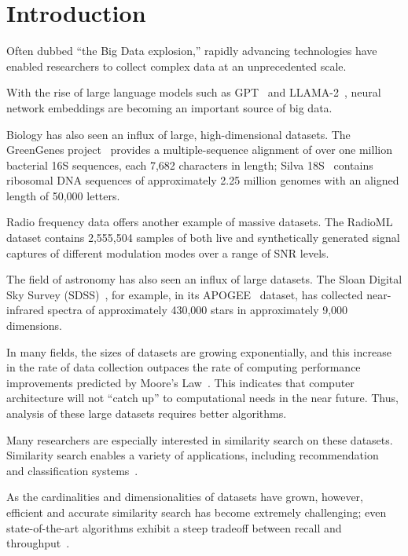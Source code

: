 \section{Introduction}
\label{sec:introduction}

Often dubbed ``the Big Data explosion,'' rapidly advancing technologies have enabled researchers to collect complex data at an unprecedented scale. 

With the rise of large language models such as GPT~\cite{2020arXiv200514165B, OpenAI2023GPT4TR} and LLAMA-2~\cite{Touvron2023Llama2O}, neural network embeddings are becoming an important source of big data.

Biology has also seen an influx of large, high-dimensional datasets.
The GreenGenes project~\cite{desantis2006greengenes} provides a multiple-sequence alignment of over one million bacterial 16S sequences, each 7,682 characters in length;
Silva 18S~\cite{10.1093/nar/gks1219} contains ribosomal DNA sequences of approximately 2.25 million genomes with an aligned length of 50,000 letters.

Radio frequency data offers another example of massive datasets. 
The RadioML~\cite{oshea2018radioml} dataset contains 2,555,504 samples of both live and synthetically generated signal captures of different modulation modes over a range of SNR levels.

The field of astronomy has also seen an influx of large datasets.
The Sloan Digital Sky Survey (SDSS)~\cite{blanton2017sdss}, for example, in its APOGEE~\cite{alam2015eleventh} dataset, has collected near-infrared spectra of approximately 430,000 stars in approximately 9,000 dimensions. 

In many fields, the sizes of datasets are growing exponentially, and this increase in the rate of data collection outpaces the rate of computing performance improvements predicted by Moore's Law~\cite{brescia2012extracting}.
This indicates that computer architecture will not ``catch up'' to computational needs in the near future.
Thus, analysis of these large datasets requires better algorithms.

Many researchers are especially interested in similarity search on these datasets. 
Similarity search enables a variety of applications, including recommendation~\cite{annoy} and classification systems~\cite{suyanto2022knnclassifier}. 

As the cardinalities and dimensionalities of datasets have grown, however, efficient and accurate similarity search has become extremely challenging; 
even state-of-the-art algorithms exhibit a steep tradeoff between recall and throughput~\cite{ishaq2019clustered}.

